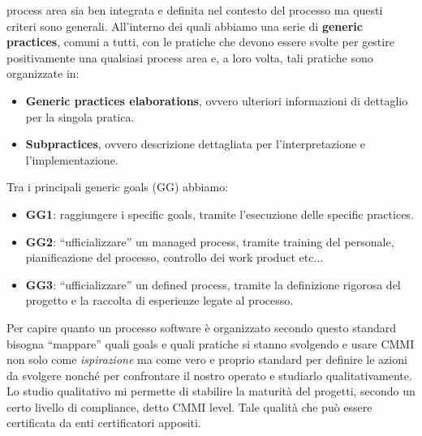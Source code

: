 \begin{itemize}
\begin{enumerate}
                        process area sia ben integrata e definita nel contesto
                        del processo ma questi criteri sono generali. All'interno
                        dei quali abbiamo una serie di \textbf{generic practices},
                        comuni a tutti, con le pratiche che devono essere svolte
                        per gestire positivamente una qualsiasi process area e,
                        a loro volta, tali pratiche sono organizzate in:
                        \begin{itemize}
                              \item \textbf{Generic practices elaborations},
                                    ovvero ulteriori informazioni di dettaglio
                                    per la singola pratica.
                              \item \textbf{Subpractices}, ovvero descrizione
                                    dettagliata per l'interpretazione e
                                    l'implementazione.
                        \end{itemize}
                        Tra i principali generic goals (GG) abbiamo:
                        \begin{itemize}
                              \item \textbf{GG1}: raggiungere i specific goals,
                                    tramite l'esecuzione delle specific practices.
                              \item \textbf{GG2}: “ufficializzare” un managed process,
                                    tramite training del personale, pianificazione del
                                    processo, controllo dei work product etc$\dots$
                              \item \textbf{GG3}: “ufficializzare” un defined process,
                                    tramite la definizione rigorosa del progetto e la
                                    raccolta di esperienze legate al processo.
                        \end{itemize}
            \end{enumerate}
\end{itemize}
Per capire quanto un processo software è organizzato secondo questo standard
bisogna “mappare” quali goals e quali pratiche si stanno svolgendo e usare CMMI
non solo come \textit{ispirazione} ma come vero e proprio standard per definire
le azioni da svolgere nonché per confrontare il nostro operato e studiarlo
qualitativamente. Lo studio qualitativo mi permette di stabilire la maturità del
progetti, secondo un certo livello di compliance, detto CMMI level. Tale qualità
che può essere certificata da enti certificatori appositi.

